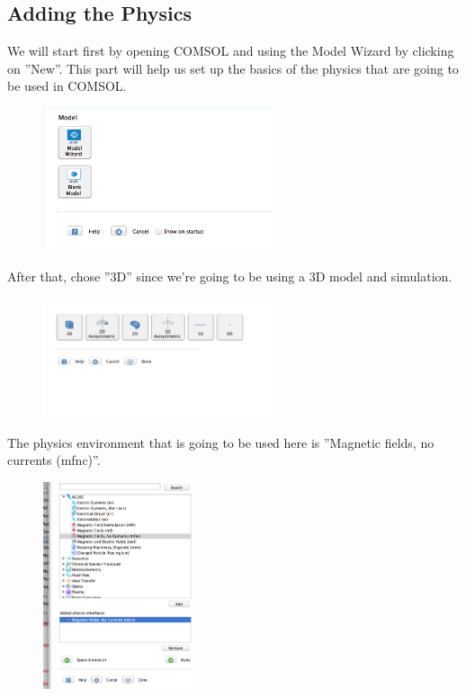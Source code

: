 \subsection{Adding the Physics}

We will start first by opening COMSOL and using the Model Wizard by clicking on ''New''. This part will help us set up the basics of the physics that are going to be used in COMSOL.\\

\begin{figure}[H]
	\centering
  \includegraphics[width=0.6\textwidth]{Pictures/Screenshots/Sim1.png}
\end{figure}

After that, chose ''3D'' since we're going to be using a 3D model and simulation.\\

\begin{figure}[H]
	\centering
  \includegraphics[width=0.6\textwidth]{Pictures/Screenshots/Sim2.png}
\end{figure}

The physics environment that is going to be used here is ''Magnetic fields, no currents (mfnc)''.\\

\begin{figure}[H]
	\centering
  \includegraphics[width=0.4\textwidth]{Pictures/Screenshots/Sim3.png}
\end{figure}

